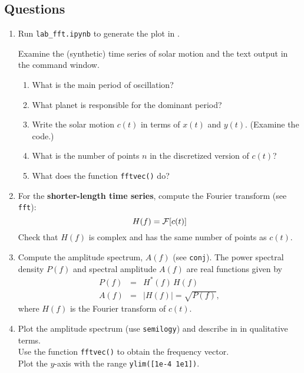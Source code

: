 \documentclass[11pt,titlepage,fleqn]{article}
\begin{document}
\begin{spacing}{2.0}

\section*{Questions}

\begin{enumerate}

\item Run \verb+lab_fft.ipynb+ to generate the plot in .

Examine the (synthetic) time series of solar motion and the text output in the command window.
%
\begin{enumerate}
\item What is the main period of oscillation?
\item What planet is responsible for the dominant period?
\item Write the solar motion $c(t)$ in terms of $x(t)$ and $y(t)$. (Examine the code.)
\item What is the number of points $n$ in the discretized version of $c(t)$? 
\item What does the function \verb+fftvec()+ do?
\end{enumerate}


\item For the {\bf shorter-length time series}, compute the Fourier transform (see \verb+fft+):
%
\begin{equation*}
H(f) = \mbox{$\cal F$}[c(t)]
\end{equation*}
%
Check that $H(f)$ is complex and has the same number of points as $c(t)$.


\item  Compute the amplitude spectrum, $A(f)$ (see \verb+conj+).
The power spectral density $P(f)$ and spectral amplitude $A(f)$ are real functions given by
%
\begin{eqnarray*}
P(f) &=& H^{*}(f)\,H(f)
\\
A(f) &=& |H(f)| = \sqrt{P(f)},
\end{eqnarray*}
%
where $H(f)$ is the Fourier transform of $c(t)$.


\item Plot the amplitude spectrum (use \verb+semilogy+) and describe in in qualitative terms. \\
Use the function \verb+fftvec()+ to obtain the frequency vector. \\
Plot the $y$-axis with the range \verb+ylim([1e-4 1e1])+.


\end{enumerate}
\end{spacing}
\end{document}
